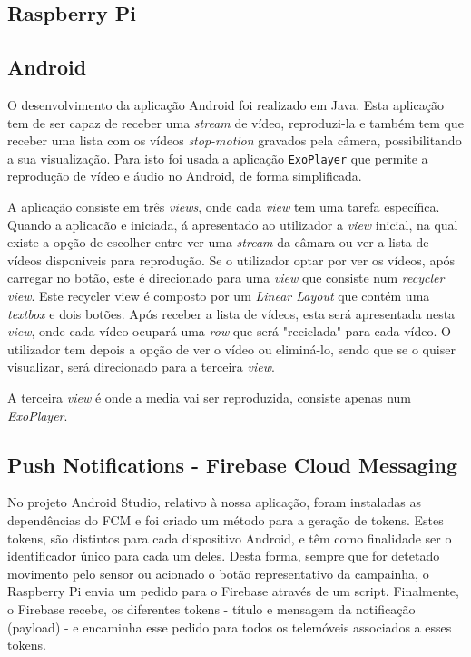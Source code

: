 \documentclass{article}
\begin{document}
\subsection{Raspberry Pi}
\subsection{Android}

O desenvolvimento da aplicação Android foi realizado em Java. Esta aplicação tem de ser capaz de receber uma \textit{stream} de vídeo, reproduzi-la e também tem que receber uma lista com os vídeos \textit{stop-motion} gravados pela câmera, possibilitando a sua visualização. Para isto foi usada a aplicação \texttt{ExoPlayer} que permite a reprodução de vídeo e áudio no Android, de forma simplificada.

A aplicação consiste em três \textit{views}, onde cada \textit{view} tem uma tarefa específica. Quando a aplicacão e iniciada, á apresentado ao utilizador a \textit{view} inicial, na qual existe a opção de escolher entre ver uma \textit{stream} da câmara ou ver a lista de vídeos disponiveis para reprodução. Se o utilizador optar por ver os vídeos, após carregar no botão, este é direcionado para uma \textit{view} que consiste num \textit{recycler view}. Este recycler view é composto por um \textit{Linear Layout} que contém uma \textit{textbox} e dois botões. Após receber a lista de vídeos, esta será apresentada nesta \textit{view}, onde cada vídeo ocupará uma \textit{row} que será "reciclada" para cada vídeo. O utilizador tem depois a opção de ver o vídeo ou eliminá-lo, sendo que se o quiser visualizar, será direcionado para a terceira \textit{view}.

A terceira \textit{view} é onde a media vai ser reproduzida, consiste apenas num \textit{ExoPlayer}.


\subsection{Push Notifications - Firebase Cloud Messaging}
No projeto Android Studio, relativo à nossa aplicação, foram instaladas as dependências do FCM e foi criado um método para a geração de tokens. Estes tokens, são distintos para cada dispositivo Android, e têm como finalidade ser o identificador único para cada um deles. Desta forma, sempre que for detetado movimento pelo sensor ou acionado o botão representativo da campainha, o Raspberry Pi envia um pedido para o Firebase através de um script. Finalmente, o Firebase recebe, os diferentes tokens - título e mensagem da notificação (payload) - e encaminha esse pedido para todos os telemóveis associados a esses tokens.
\end{document}

